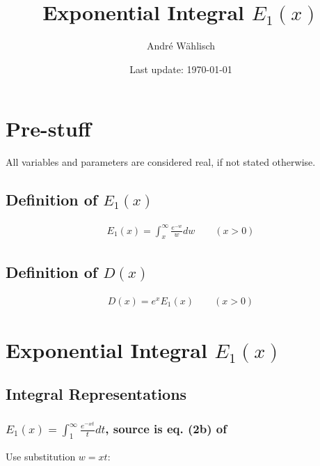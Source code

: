 \documentclass[bibliography=totocnumbered]{scrartcl}
\title{Exponential Integral $E_1\left(x\right)$}
\author{André Wählisch}
\date{Last update: \today}
\begin{document}
	\maketitle
	\tableofcontents
	\clearpage
	
	\section{Pre-stuff}
	
	All variables and parameters are considered real, if not stated otherwise.
	
	\subsection[Definition of E1(x)]{Definition of $E_1\left(x\right)$}
	
	\begin{gather}
		E_1\left(x\right)=\int_{x}^{\infty}\frac{e^{-w}}{w}dw\qquad\left(x>0\right)
	\end{gather}
	
	\subsection[Definition of D(x)]{Definition of $D\left(x\right)$}
	\label{subsec: D}
	
	\begin{gather}
		D\left(x\right)=e^xE_1\left(x\right)\qquad\left(x>0\right)\label{eq: D}
	\end{gather}
	
	\clearpage
	
	\section[Exponential Integral E1(x)]{Exponential Integral $E_1\left(x\right)$}
	
	\subsection{Integral Representations}
	
	\subsubsection[Integral representation not involving x in the integral limits]{$E_1\left(x\right)=\int_{1}^{\infty}\frac{e^{-xt}}{t}dt$, source is eq. (2b) of \cite{boer1990calc}}
	\label{subsubsec: def01}
	
	Use substitution $w=xt$:
	
\end{document}
